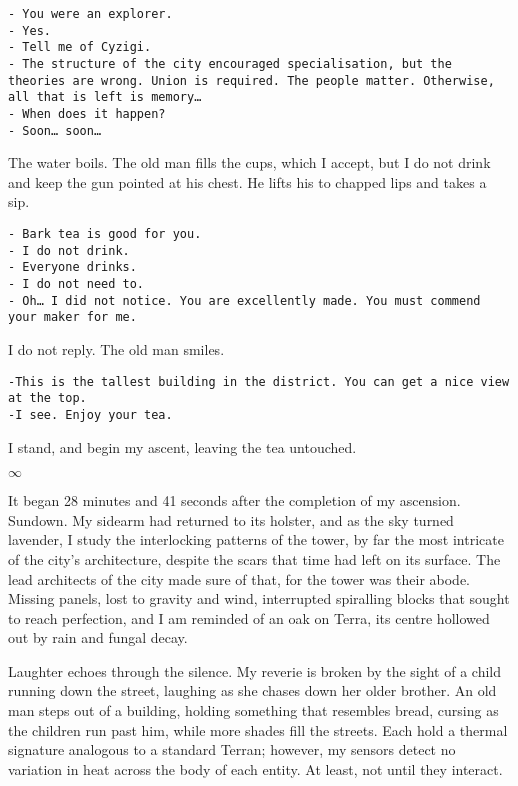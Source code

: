 \texttt{- You were an explorer.\\
- Yes.\\
- Tell me of Cyzigi.\\
- The structure of the city encouraged specialisation, but the theories are wrong. Union is required. The people matter. Otherwise, all that is left is memory…\\
- When does it happen?\\
- Soon… soon…}

The water boils. The old man fills the cups, which I accept, but I do not drink and keep the gun pointed at his chest. He lifts his to chapped lips and takes a sip.

\texttt{- Bark tea is good for you.\\
- I do not drink.\\
- Everyone drinks.\\
- I do not need to.\\
- Oh… I did not notice. You are excellently made. You must commend your maker for me.}

I do not reply. The old man smiles. 

\texttt{-This is the tallest building in the district. You can get a nice view at the top.\\
-I see. Enjoy your tea.}

I stand, and begin my ascent, leaving the tea untouched.

\begin{center}
    $\infty$
\end{center}

It began 28 minutes and 41 seconds after the completion of my ascension. Sundown. My sidearm had returned to its holster, and as the sky turned lavender, I study the interlocking patterns of the tower, by far the most intricate of the city’s architecture, despite the scars that time had left on its surface. The lead architects of the city made sure of that, for the tower was their abode. Missing panels, lost to gravity and wind, interrupted spiralling blocks that sought to reach perfection, and I am reminded of an oak on Terra, its centre hollowed out by rain and fungal decay.

Laughter echoes through the silence. My reverie is broken by the sight of a child running down the street, laughing as she chases down her older brother. An old man steps out of a building, holding something that resembles bread, cursing as the children run past him, while more shades fill the streets. Each hold a thermal signature analogous to a standard Terran; however, my sensors detect no variation in heat across the body of each entity. At least, not until they interact.

